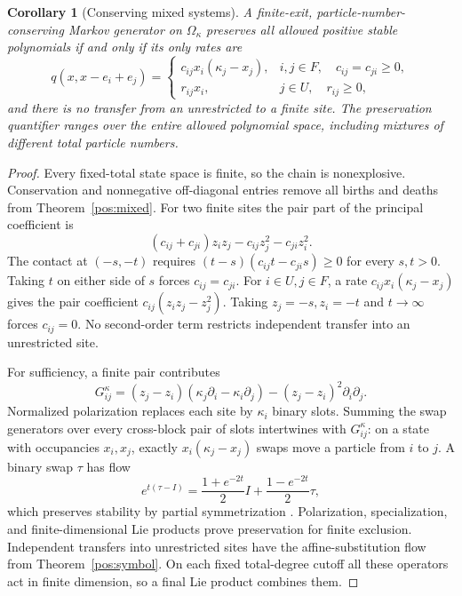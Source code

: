 \documentclass[reqno]{amsart}
\newtheorem{corollary}[theorem]{Corollary}
\theoremstyle{definition}
\theoremstyle{remark}
\begin{document}
\begin{corollary}[Conserving mixed systems]\label{pos:conserving}
A finite-exit, particle-number-conserving Markov generator on \(\Omega_\kappa\)
preserves all allowed positive stable polynomials if and only if its only rates are
\[
 q(x,x-e_i+e_j)=
 \begin{cases}
 c_{ij}x_i(\kappa_j-x_j),&i,j\in F,\quad c_{ij}=c_{ji}\ge0,\\
 r_{ij}x_i,&j\in U,\quad r_{ij}\ge0,
 \end{cases}
\]
and there is no transfer from an unrestricted to a finite site.
The preservation quantifier ranges over the entire allowed polynomial space,
including mixtures of different total particle numbers.
\end{corollary}
\begin{proof}
Every fixed-total state space is finite, so the chain is nonexplosive.
Conservation and nonnegative off-diagonal entries remove all births and deaths
from Theorem~\ref{pos:mixed}.
For two finite sites the pair part of the principal coefficient is
\[
 (c_{ij}+c_{ji})z_i z_j-c_{ij}z_j^2-c_{ji}z_i^2.
\]
The contact at \((-s,-t)\) requires
\((t-s)(c_{ij}t-c_{ji}s)\ge0\) for every \(s,t>0\).
Taking \(t\) on either side of \(s\) forces \(c_{ij}=c_{ji}\).
For \(i\in U,j\in F\), a rate \(c_{ij}x_i(\kappa_j-x_j)\) gives the pair
coefficient \(c_{ij}(z_i z_j-z_j^2)\).  Taking \(z_j=-s,z_i=-t\) and
\(t\to\infty\) forces \(c_{ij}=0\).
No second-order term restricts independent transfer into an unrestricted site.

For sufficiency, a finite pair contributes
\begin{equation}\label{pos:exclusion-generator}
 G_{ij}^\kappa=(z_j-z_i)(\kappa_j\partial_i-\kappa_i\partial_j)
                  -(z_j-z_i)^2\partial_i\partial_j.
\end{equation}
Normalized polarization replaces each site by \(\kappa_i\) binary slots.
Summing the swap generators over every cross-block pair of slots intertwines
with \(G_{ij}^\kappa\): on a state with occupancies \(x_i,x_j\), exactly
\(x_i(\kappa_j-x_j)\) swaps move a particle from \(i\) to \(j\).
A binary swap \(\tau\) has flow
\[
 e^{t(\tau-I)}=\frac{1+e^{-2t}}2I+\frac{1-e^{-2t}}2\tau,
\]
which preserves stability by partial symmetrization \cite{BBL09}.
Polarization, specialization, and finite-dimensional Lie products prove
preservation for finite exclusion.  Independent transfers into unrestricted
sites have the affine-substitution flow from Theorem~\ref{pos:symbol}.
On each fixed total-degree cutoff all these operators act in finite dimension,
so a final Lie product combines them.
\end{proof}
\end{document}
